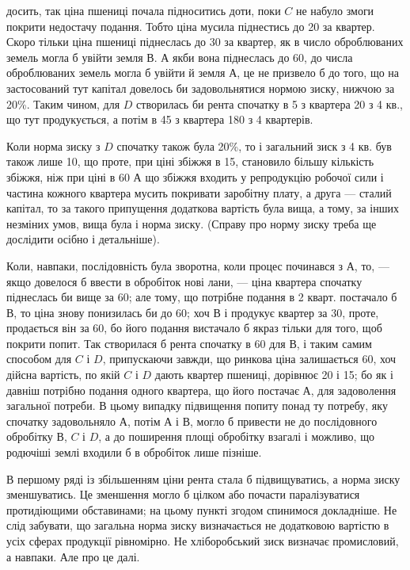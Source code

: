 \parcont{}  %
досить, так ціна пшениці почала підноситись доти, поки $C$ не набуло змоги
покрити недостачу подання. Тобто ціна мусила піднестись до 20 за
квартер. Скоро тільки ціна пшениці піднеслась до 30 за квартер, як
в число оброблюваних земель могла б увійти земля $В$. А якби вона піднеслась
до 60, до числа оброблюваних земель могла б увійти й земля $А$, це
не призвело б до того, що на застосований тут капітал довелось би задовольнятися
нормою зиску, нижчою за 20\%. Таким чином, для $D$ створилась би
рента спочатку в 5 з квартера \deq{} 20 з 4 кв., що тут продукується,
а потім в 45 з квартера \deq{} 180 з 4 квартерів.

Коли норма зиску з $D$ спочатку також була \deq{} 20\%, то і загальний зиск
з 4 кв. був також лише 10, що проте, при ціні збіжжя в 15, становило
більшу кількість збіжжя, ніж при ціні в 60 А що збіжжя входить
у репродукцію робочої сили і частина кожного квартера мусить покривати заробітну
плату, а друга — сталий капітал, то за такого припущення додаткова
вартість була вища, а тому, за інших незміних умов, вища була і норма зиску.
(Справу про норму зиску треба ще дослідити осібно і детальніше).

Коли, навпаки, послідовність була зворотна, коли процес починався з $А$,
то, — якщо довелося б ввести в обробіток нові лани, — ціна квартера спочатку
піднеслась би вище за 60; але тому, що потрібне подання в 2 кварт. постачало
б $В$, то ціна знову понизилась би до 60; хоч $В$ і продукує квартер
за 30, проте, продається він за 60, бо його подання вистачало б
якраз тільки для того, щоб покрити попит. Так створилася б рента спочатку в
60 для $В$, і таким самим способом для $C$ і $D$, припускаючи завжди, що
ринкова ціна залишається 60, хоч дійсна вартість, по якій $C$ і $D$ дають
квартер пшениці, дорівнює 20 і 15; бо як і давніш потрібно подання одного
квартера, що його постачає $А$, для задоволення загальної потреби. В цьому випадку
підвищення попиту понад ту потребу, яку спочатку задовольняло $А$, потім
$А$ і $В$, могло б привести не до послідовного обробітку $В$, $C$ і $D$, а до поширення
площі обробітку взагалі і можливо, що родючіші землі входили б в обробіток
лише пізніше.

В першому ряді із збільшенням ціни рента стала б підвищуватись, а норма
зиску зменшуватись. Це зменшення могло б цілком або почасти паралізуватися
протидіющими обставинами; на цьому пункті згодом спинимося докладніше.
Не слід забувати, що загальна норма зиску визначається не додатковою вартістю
в усіх сферах продукції рівномірно. Не хліборобський зиск визначає промисловий,
а навпаки. Але про це далі.

